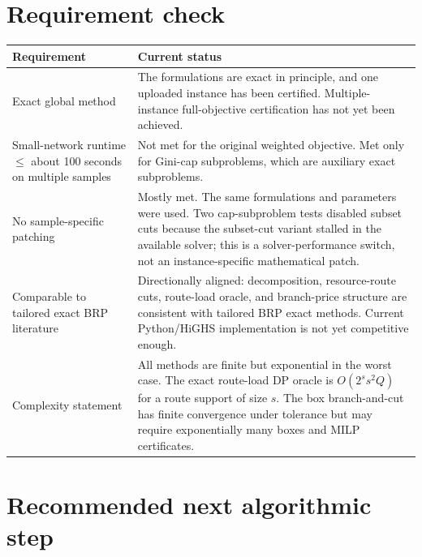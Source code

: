 \documentclass[11pt]{article}
\begin{document}
\section{Requirement check}

\begin{longtable}{p{}p{}}
\toprule
Requirement & Current status \\
\midrule
Exact global method & The formulations are exact in principle, and one uploaded instance has been certified.  Multiple-instance full-objective certification has not yet been achieved. \\
Small-network runtime $\le$ about 100 seconds on multiple samples & Not met for the original weighted objective.  Met only for Gini-cap subproblems, which are auxiliary exact subproblems. \\
No sample-specific patching & Mostly met.  The same formulations and parameters were used.  Two cap-subproblem tests disabled subset cuts because the subset-cut variant stalled in the available solver; this is a solver-performance switch, not an instance-specific mathematical patch. \\
Comparable to tailored exact BRP literature & Directionally aligned: decomposition, resource-route cuts, route-load oracle, and branch-price structure are consistent with tailored BRP exact methods.  Current Python/HiGHS implementation is not yet competitive enough. \\
Complexity statement & All methods are finite but exponential in the worst case.  The exact route-load DP oracle is $O(2^s s^2 Q)$ for a route support of size $s$.  The box branch-and-cut has finite convergence under tolerance but may require exponentially many boxes and MILP certificates. \\
\bottomrule
\end{longtable}

\section{Recommended next algorithmic step}
\end{document}
